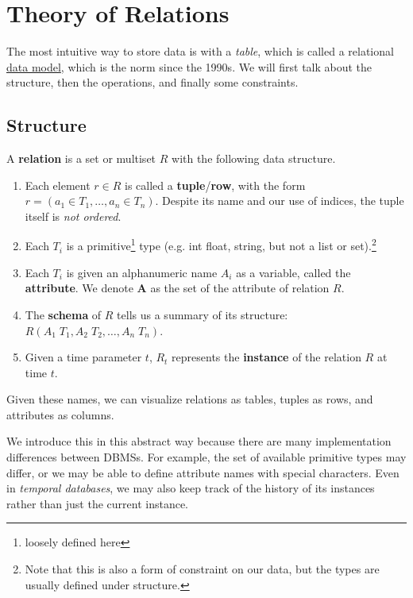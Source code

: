 \section{Theory of Relations}

  The most intuitive way to store data is with a \textit{table}, which is called a relational \hyperref[def:data-model]{data model}, which is the norm since the 1990s. We will first talk about the structure, then the operations, and finally some constraints. 

\subsection{Structure}

  \begin{definition}[Relation]
    \label{def:relation}
    A \textbf{relation} is a set or multiset $R$ with the following data structure. 
    \begin{enumerate}
      \item Each element $r \in R$ is called a \textbf{tuple}/\textbf{row}, with the form $r = (a_1 \in T_1, \ldots, a_n \in T_n)$. Despite its name and our use of indices, the tuple itself is \textit{not ordered}. 
      \item Each $T_i$ is a primitive\footnote{loosely defined here} type (e.g. int float, string, but not a list or set).\footnote{Note that this is also a form of constraint on our data, but the types are usually defined under structure.}
      \item Each $T_i$ is given an alphanumeric name $A_i$ as a variable, called the \textbf{attribute}. We denote $\mathbf{A}$ as the set of the attribute of relation $R$. 
      \item The \textbf{schema} of $R$ tells us a summary of its structure: $R(A_1 \; T_1, A_2 \; T_2, \ldots, A_n \; T_n)$. 
      \item Given a time parameter $t$, $R_t$ represents the \textbf{instance} of the relation $R$ at time $t$. 
    \end{enumerate}
    Given these names, we can visualize relations as tables, tuples as rows, and attributes as columns. 
  \end{definition} 

  We introduce this in this abstract way because there are many implementation differences between DBMSs. For example, the set of available primitive types may differ, or we may be able to define attribute names with special characters. Even in \textit{temporal databases}, we may also keep track of the history of its instances rather than just the current instance. 

